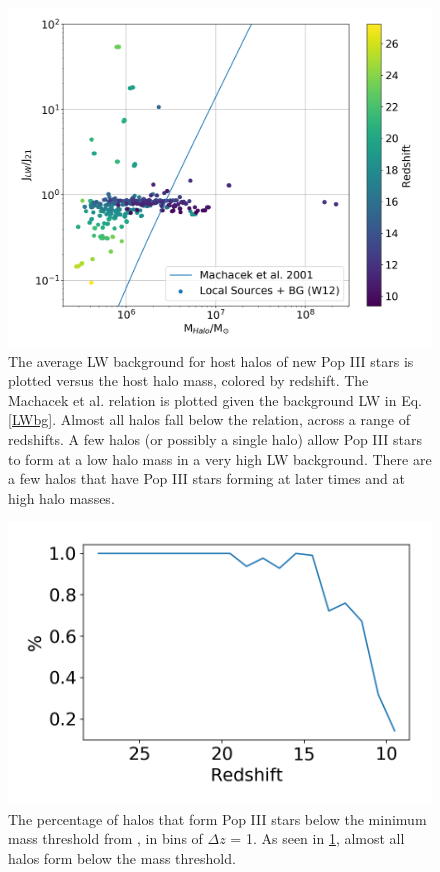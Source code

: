 \documentclass[a4paper,fleqn,usenatbib]{mnras}
\begin{document}
\begin{figure}
	\includegraphics[width=\columnwidth]{images/jlw_mass_machacek_total.png}
    \caption{The average LW background for host halos of new Pop III stars is plotted versus the host halo mass, colored by redshift. The Machacek et al. relation is plotted given the background LW in Eq. \ref{LWbg}. Almost all halos fall below the relation, across a range of redshifts. A few halos (or possibly a single halo) allow Pop III stars to form at a low halo mass in a very high LW background. There are a few halos that have Pop III stars forming at later times and at high halo masses.}
    \label{fig:jlw_mass_machacek}{}
\end{figure}

\begin{figure}
	\includegraphics[width=\columnwidth]{images/percent_below_dz1.png}
    \caption{The percentage of halos that form Pop III stars below the minimum mass threshold from \citet{Machacek01}, in bins of $\Delta z$ = 1. As seen in \ref{fig:jlw_mass_machacek}, almost all halos form below the mass threshold.}
    \label{fig:percent_below_dz1}
\end{figure}
\end{document}
